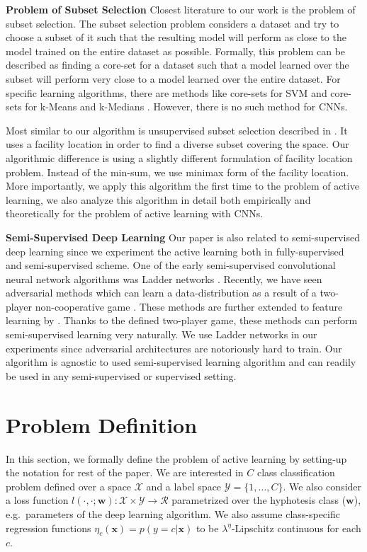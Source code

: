 \documentclass{article}
\begin{document}
\noindent\textbf{Problem of Subset Selection}
Closest literature to our work is the problem of subset selection. The subset selection problem considers a dataset and try to choose a subset of it such that the resulting model will perform as close to the model trained on the entire dataset as possible. Formally, this problem can be described as finding a core-set for a dataset such that a model learned over the subset will perform very close to a model learned over the entire dataset. For specific learning algorithms, there are methods like core-sets for SVM \cite{tsang2005core} and core-sets for k-Means and k-Medians \cite{har2005smaller}. However, there is no such method for CNNs.

Most similar to our algorithm is unsupervised subset selection described in \cite{wei2013using}. It uses a facility location in order to find a diverse subset covering the space. Our algorithmic difference is using a slightly different formulation of facility location problem. Instead of the min-sum, we use minimax \cite{facility} form of the facility location. More importantly, we apply this algorithm the first time to the problem of active learning, we also analyze this algorithm in detail both empirically and theoretically for the problem of active learning with CNNs.

 
\noindent\textbf{Semi-Supervised Deep Learning}
Our paper is also related to semi-supervised deep learning since we experiment the active learning both in fully-supervised and semi-supervised scheme. 
One of the early semi-supervised convolutional neural network algorithms was Ladder networks \cite{ladder}. Recently, we have seen adversarial methods which can learn a data-distribution as a result of a two-player non-cooperative game \cite{salimans2016improved,gan_original,dcgan}. These methods are further extended to feature learning by \cite{ali, bigan}. Thanks to the defined two-player game, these methods can perform semi-supervised learning very naturally. We use Ladder networks in our experiments since adversarial architectures are notoriously hard to train. Our algorithm is agnostic to used semi-supervised learning algorithm and can readily be used in any semi-supervised or supervised setting.

\section{Problem Definition}
In this section, we formally define the problem of active learning by setting-up the notation for rest of the paper. We are interested in $C$ class classification problem defined over a space $\mathcal{X}$ and a label space  $\mathcal{Y}=\{1,\ldots,C\}$. We also consider a loss function $l(\cdot,\cdot;\mathbf{w}):\mathcal{X}\times \mathcal{Y} \rightarrow \mathcal{R}$ parametrized over the hyphotesis class ($\mathbf{w}$), e.g.\ parameters of the deep learning algorithm. We also assume class-specific regression functions $\eta_c(\mathbf{x})=p(y=c|\mathbf{x})$ to be \mbox{$\lambda^\eta$-Lipschitz} continuous for each $c$.
\end{document}
